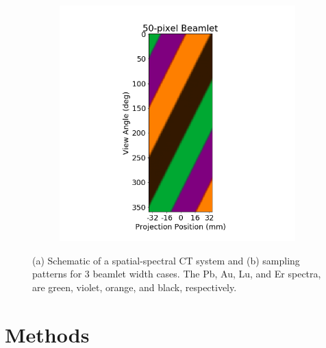 \documentclass[12pt]{spieman}  %
\begin{document}
\begin{spacing}{1}
\begin{figure}
\begin{subfigure}[t]{.55\textwidth}
      \includegraphics[clip, trim={5cm 1cm 6cm 1cm}, scale = 0.3]{figures/CMYK_xi50.png}
      \caption{}
      \label{fig:spatialSpectralSampling}
    \end{subfigure}%
    \vspace{4mm}
    \caption{ (a) Schematic of a spatial-spectral CT system and (b) sampling patterns for 3 beamlet width cases. 
    The Pb, Au, Lu, and Er spectra, are green, violet, orange, and black, respectively.}
    \label{fig:spectralSampling}
\end{figure}





\vspace{-1mm}

\section{Methods}


\end{spacing}
\end{document}
